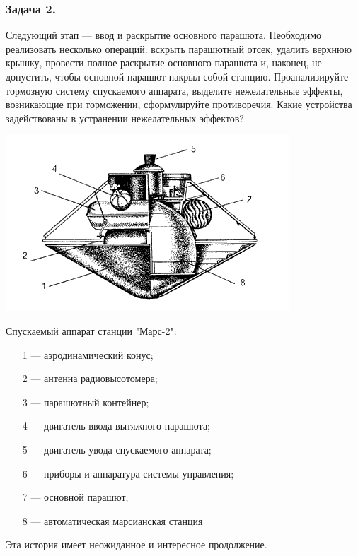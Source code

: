 \documentclass[11pt,a4paper]{article}
\begin{document}
\subsubsection*{Задача 2.}
Следующий этап — ввод и раскрытие основного парашюта. Необходимо реализовать
несколько операций: вскрыть парашютный отсек, удалить верхнюю крышку, провести
полное раскрытие основного парашюта и, наконец, не допустить, чтобы основной
парашют накрыл собой станцию. Проанализируйте тормозную систему спускаемого
аппарата, выделите нежелательные эффекты, возникающие при торможении,
сформулируйте противоречия. Какие устройства задействованы в устранении
нежелательных эффектов?
\begin{center}
\includegraphics[width=.4\textwidth]{GIj0Ml.png}\hfill
  \begin{minipage}[b]{.55\textwidth}\small
    Спускаемый аппарат станции "Марс-2":
    \begin{itemize}[noitemsep]
    \item[1] — аэродинамический конус;
    \item[2] — антенна радиовысотомера;
    \item[3] — парашютный контейнер;
    \item[4] — двигатель ввода вытяжного парашюта;
    \item[5] — двигатель увода спускаемого аппарата;
    \item[6] — приборы и аппаратура системы управления;
    \item[7] — основной парашют;
    \item[8] — автоматическая марсианская станция
    \end{itemize}
  \end{minipage}
\end{center}
Эта история имеет неожиданное и интересное продолжение.
\end{document}
